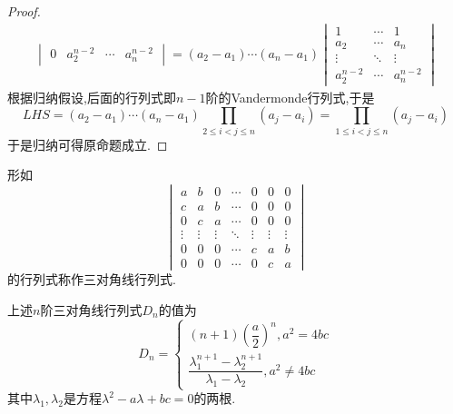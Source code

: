 \documentclass{ctexart}
\begin{document}
\begin{proof}
\[\begin{aligned}
\begin{vmatrix}
            0&a_2^{n-2}&\cdots&a_n^{n-2}
        \end{vmatrix}=\left(a_2-a_1\right)\cdots\left(a_n-a_1\right)\begin{vmatrix}
            1&\cdots&1\\
            a_2&\cdots&a_n\\
            \vdots&\ddots&\vdots\\
            a_2^{n-2}&\cdots&a_n^{n-2}
        \end{vmatrix}
    \end{aligned}\]
    根据归纳假设,后面的行列式即$n-1$阶的Vandermonde行列式,于是
    \[LHS=\left(a_2-a_1\right)\cdots\left(a_n-a_1\right)\prod_{2\leqslant i<j\leqslant n}\left(a_j-a_i\right)=\prod_{1\leqslant i<j\leqslant n}\left(a_j-a_i\right)\]
    于是归纳可得原命题成立.
\end{proof}
\begin{definition}[三对角线行列式]
    形如
    \[\begin{vmatrix}
        a&b&0&\cdots&0&0&0\\
        c&a&b&\cdots&0&0&0\\
        0&c&a&\cdots&0&0&0\\
        \vdots&\vdots&\vdots&\ddots&\vdots&\vdots&\vdots\\
        0&0&0&\cdots&c&a&b\\
        0&0&0&\cdots&0&c&a
    \end{vmatrix}\]
    的行列式称作三对角线行列式.
\end{definition}
\begin{theorem}
    上述$n$阶三对角线行列式$D_n$的值为
    \[D_n=\left\{\begin{array}{l}
        (n+1)\left(\dfrac{a}{2}\right)^n,a^2=4bc\\
        \dfrac{\lambda_1^{n+1}-\lambda_2^{n+1}}{\lambda_1-\lambda_2},a^2\neq4bc
    \end{array}\right.\]
    其中$\lambda_1,\lambda_2$是方程$\lambda^2-a\lambda+bc=0$的两根.
\end{theorem}
\end{document}
